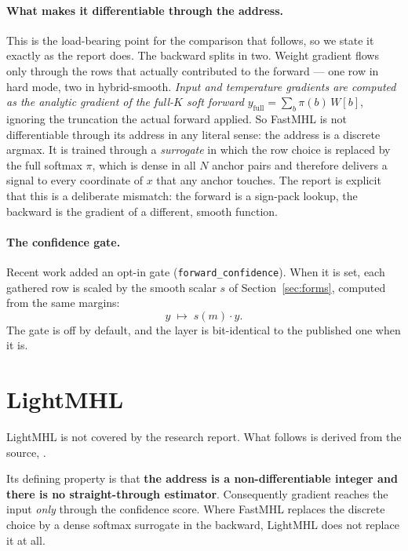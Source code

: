 \documentclass[11pt]{article}
\newcommand{\NAP}{N}
\newcommand{\Rows}{K}
\begin{document}
\paragraph{What makes it differentiable through the address.}
This is the load-bearing point for the comparison that follows, so we state it exactly as
the report does. The backward splits in two. Weight gradient flows only through the rows
that actually contributed to the forward --- one row in hard mode, two in hybrid-smooth.
\emph{Input and temperature gradients are computed as the analytic gradient of the
full-$\Rows$ soft forward} $y_{\text{full}}=\sum_b \pi(b)\,W[b]$, ignoring the truncation
the actual forward applied. So FastMHL is not differentiable through its address in any
literal sense: the address is a discrete argmax. It is trained through a
\emph{surrogate} in which the row choice is replaced by the full softmax $\pi$, which is
dense in all $\NAP$ anchor pairs and therefore delivers a signal to every coordinate of
$x$ that any anchor touches. The report is explicit that this is a deliberate mismatch:
the forward is a sign-pack lookup, the backward is the gradient of a different, smooth
function.

\paragraph{The confidence gate.}
Recent work added an opt-in gate (\texttt{forward\_confidence}). When it is set, each
gathered row is scaled by the smooth scalar $s$ of Section~\ref{sec:forms}, computed from
the same margins:
\begin{equation}
  y \;\longmapsto\; s(m)\cdot y .
\end{equation}
The gate is off by default, and the layer is bit-identical to the published one when it is.

\section{LightMHL}

LightMHL is not covered by the research report. What follows is derived from the source,
.

Its defining property is that \textbf{the address is a non-differentiable integer and
there is no straight-through estimator}. Consequently gradient reaches the input
\emph{only} through the confidence score. Where FastMHL replaces the discrete choice by a
dense softmax surrogate in the backward, LightMHL does not replace it at all.
\end{document}
